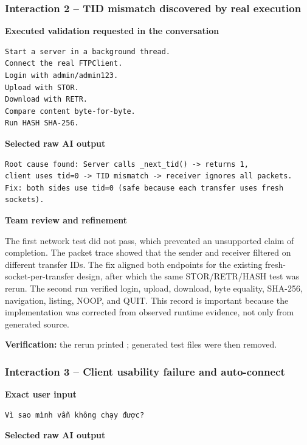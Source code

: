 \subsubsection{Interaction 2 -- TID mismatch discovered by real execution}

\sourceA

\textbf{Executed validation requested in the conversation}

\begin{lstlisting}
Start a server in a background thread.
Connect the real FTPClient.
Login with admin/admin123.
Upload with STOR.
Download with RETR.
Compare content byte-for-byte.
Run HASH SHA-256.
\end{lstlisting}

\textbf{Selected raw AI output}

\begin{lstlisting}
Root cause found: Server calls _next_tid() -> returns 1,
client uses tid=0 -> TID mismatch -> receiver ignores all packets.
Fix: both sides use tid=0 (safe because each transfer uses fresh sockets).
\end{lstlisting}

\textbf{Team review and refinement}

The first network test did not pass, which prevented an unsupported claim of
completion. The packet trace showed that the sender and receiver filtered on
different transfer IDs. The fix aligned both endpoints for the existing
fresh-socket-per-transfer design, after which the same STOR/RETR/HASH test was
rerun. The second run verified login, upload, download, byte equality,
SHA-256, navigation, listing, NOOP, and QUIT. This record is important because
the implementation was corrected from observed runtime evidence, not only
from generated source.

\textbf{Verification:} the rerun printed ; generated
test files were then removed.

\subsubsection{Interaction 3 -- Client usability failure and auto-connect}

\sourceA

\textbf{Exact user input}

\begin{lstlisting}
Vì sao mình vẫn không chạy được?
\end{lstlisting}

\textbf{Selected raw AI output}

